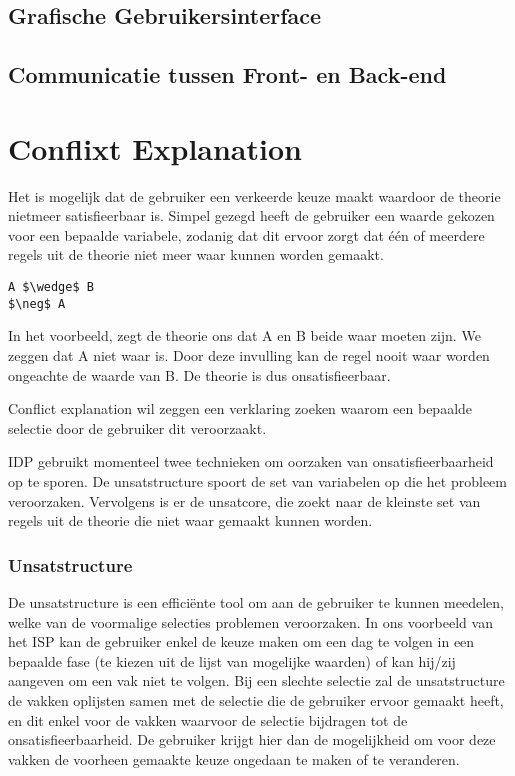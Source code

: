 \subsection{Grafische Gebruikersinterface}

\subsection{Communicatie tussen Front- en Back-end}

\section{Conflixt Explanation}
Het is mogelijk dat de gebruiker een verkeerde keuze maakt waardoor de theorie nietmeer satisfieerbaar is. Simpel gezegd heeft de gebruiker een waarde gekozen voor een bepaalde variabele, zodanig dat dit ervoor zorgt dat \'{e}\'{e}n of meerdere regels uit de theorie niet meer waar kunnen worden gemaakt.

\begin{lstlisting}[mathescape]
A $\wedge$ B
$\neg$ A
\end{lstlisting}

In het voorbeeld, zegt de theorie ons dat A en B beide waar moeten zijn. We zeggen dat A niet waar is. Door deze invulling kan de regel nooit waar worden ongeachte de waarde van B. De theorie is dus onsatisfieerbaar. 

Conflict explanation wil zeggen een verklaring zoeken waarom een bepaalde selectie door de gebruiker dit veroorzaakt. 

IDP gebruikt momenteel twee technieken om oorzaken van onsatisfieerbaarheid op te sporen. De unsatstructure spoort de set van variabelen op die het probleem veroorzaken. Vervolgens is er de unsatcore, die zoekt naar de kleinste set van regels uit de theorie die niet waar gemaakt kunnen worden.

\subsubsection{Unsatstructure}
De unsatstructure is een efficiënte tool om aan de gebruiker te kunnen meedelen, welke van de voormalige selecties problemen veroorzaken. In ons voorbeeld van het ISP kan de gebruiker enkel de keuze maken om een dag te volgen in een bepaalde fase (te kiezen uit de lijst van mogelijke waarden) of kan hij/zij aangeven om een vak niet te volgen. 
Bij een slechte selectie zal de unsatstructure de vakken oplijsten samen met de selectie die de gebruiker ervoor gemaakt heeft, en dit enkel voor de vakken waarvoor de selectie bijdragen tot de onsatisfieerbaarheid. De gebruiker krijgt hier dan de mogelijkheid om voor deze vakken de voorheen gemaakte keuze ongedaan te maken of te veranderen. 

